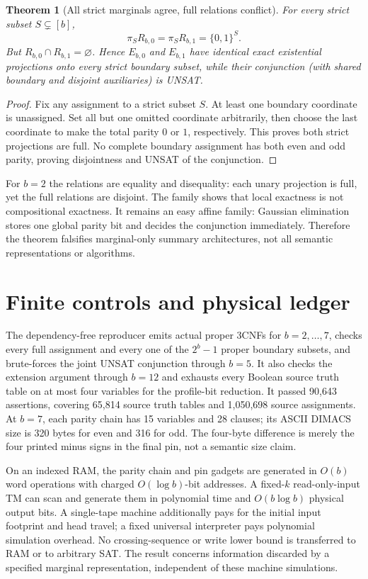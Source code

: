 \documentclass[11pt]{article}
\newtheorem{theorem}{Theorem}
\begin{document}
\begin{theorem}[All strict marginals agree, full relations conflict]
For every strict subset $S\subsetneq[b]$,
\[
 \pi_S R_{b,0}=\pi_S R_{b,1}=\{0,1\}^{S}.
\]
But $R_{b,0}\cap R_{b,1}=\varnothing$.  Hence $E_{b,0}$ and $E_{b,1}$ have identical exact existential projections onto \emph{every} strict boundary subset, while their conjunction (with shared boundary and disjoint auxiliaries) is UNSAT.
\end{theorem}
\begin{proof}
Fix any assignment to a strict subset $S$.  At least one boundary coordinate is unassigned.  Set all but one omitted coordinate arbitrarily, then choose the last coordinate to make the total parity $0$ or $1$, respectively.  This proves both strict projections are full.  No complete boundary assignment has both even and odd parity, proving disjointness and UNSAT of the conjunction.
\end{proof}

For $b=2$ the relations are equality and disequality: each unary projection is full, yet the full relations are disjoint.  The family shows that local exactness is not compositional exactness.  It remains an easy affine family: Gaussian elimination stores one global parity bit and decides the conjunction immediately.  Therefore the theorem falsifies marginal-only summary architectures, not all semantic representations or algorithms.

\section{Finite controls and physical ledger}
The dependency-free reproducer emits actual proper 3CNFs for $b=2,\ldots,7$, checks every full assignment and every one of the $2^b-1$ proper boundary subsets, and brute-forces the joint UNSAT conjunction through $b=5$.  It also checks the extension argument through $b=12$ and exhausts every Boolean source truth table on at most four variables for the profile-bit reduction.  It passed 90,643 assertions, covering 65,814 source truth tables and 1,050,698 source assignments.  At $b=7$, each parity chain has 15 variables and 28 clauses; its ASCII DIMACS size is 320 bytes for even and 316 for odd.  The four-byte difference is merely the four printed minus signs in the final pin, not a semantic size claim.

On an indexed RAM, the parity chain and pin gadgets are generated in $O(b)$ word operations with charged $O(\log b)$-bit addresses.  A fixed-$k$ read-only-input TM can scan and generate them in polynomial time and $O(b\log b)$ physical output bits.  A single-tape machine additionally pays for the initial input footprint and head travel; a fixed universal interpreter pays polynomial simulation overhead.  No crossing-sequence or write lower bound is transferred to RAM or to arbitrary SAT.  The result concerns information discarded by a specified marginal representation, independent of these machine simulations.
\end{document}
